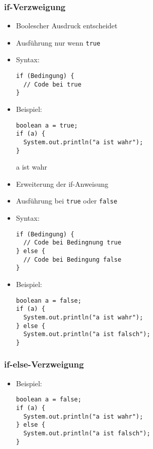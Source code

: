 \documentclass{../../presentation}
\begin{document}
\begin{frame}[fragile]
  \frametitle{if-Verzweigung}

  \begin{itemize}
    \item<1-> Boolescher Ausdruck entscheidet
    \item<1-> Ausführung nur wenn \texttt{true}
    \item<1-> Syntax:
      \begin{verbatim}
if (Bedingung) {
  // Code bei true
}
      \end{verbatim}
    \item<2-> Beispiel:
      \begin{verbatim}
boolean a = true;
if (a) {
  System.out.println("a ist wahr");
}
      \end{verbatim}
      \begin{ausgabe}
      a ist wahr
      \end{ausgabe}     
  \end{itemize}
\end{frame}



\begin{frame}[fragile]

  \begin{itemize}
    \item<1-> Erweiterung der if-Anweisung
    \item<1-> Ausführung bei \texttt{true} oder \texttt{false}
    \item<1-> Syntax:
\begin{verbatim}
if (Bedingung) {
  // Code bei Bedingnung true
} else {
  // Code bei Bedingung false
}
\end{verbatim}
    \item<2-> Beispiel:
\begin{verbatim}
boolean a = false;
if (a) {
  System.out.println("a ist wahr");
} else {
  System.out.println("a ist falsch");
}
\end{verbatim}
  \end{itemize}
\end{frame}

\begin{frame}[fragile]
    \frametitle{if-else-Verzweigung}
    \begin{itemize}
            \item<1-> Beispiel:
\begin{verbatim}
boolean a = false;
if (a) {
  System.out.println("a ist wahr");
} else {
  System.out.println("a ist falsch");
}
\end{verbatim}
    \end{itemize}

\end{frame}
\end{document}
